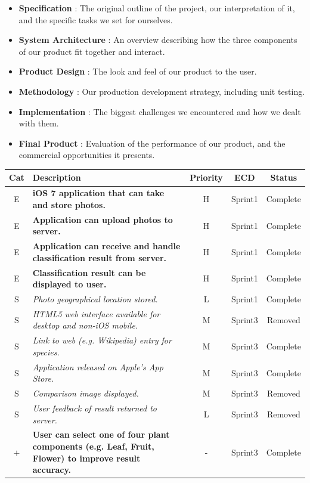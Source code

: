 \documentclass[a4paper,11pt]{article}
\begin{document}
\begin{itemize}
 \item \textbf{Specification} : The original outline of the project, our interpretation of it, and the specific tasks we set for ourselves.
 \item \textbf{System Architecture} : An overview describing how the three components of our product fit together and interact.
 \item \textbf{Product Design} : The look and feel of our product to the user.
 \item \textbf{Methodology} : Our production development strategy, including unit testing.
 \item \textbf{Implementation} : The biggest challenges we encountered and how we dealt with them.
 \item \textbf{Final Product} : Evaluation of the performance of our product, and the commercial opportunities it presents.
\end{itemize}

\begin{table}[H]
\small
\centering
\begin{tabular}{ c p{11cm} c c c }
  Cat & Description & Priority & ECD & Status\\
  \hline
  E & \textbf{iOS 7 application that can take and store photos.} & H & Sprint1 & Complete\\
  E & \textbf{Application can upload photos to server.} & H  & Sprint1 & Complete \\
  E & \textbf{Application can receive and handle classification result from server.} & H & Sprint1 & Complete\\
  E & \textbf{Classification result can be displayed to user.} & H & Sprint1 & Complete \\
  S & \textit{Photo geographical location stored.} & L & Sprint1 & Complete \\  
  S & \textit{HTML5 web interface available for desktop and non-iOS mobile.} & M & Sprint3 & Removed\\
  S & \textit{Link to web (e.g. Wikipedia) entry for species.} & M  & Sprint3 & Complete\\
  S & \textit{Application released on Apple's App Store.} & M & Sprint3 & Complete \\
  S & \textit{Comparison image displayed.} & M & Sprint3 & Removed \\
  S & \textit{User feedback of result returned to server.} & L & Sprint3 & Removed \\
  \hdashline
  $+$ & \textbf{User can select one of four plant components (e.g. Leaf, Fruit, Flower) to improve result accuracy.} & - & Sprint3 & Complete \\
\end{tabular}
\end{table}
\end{document}
